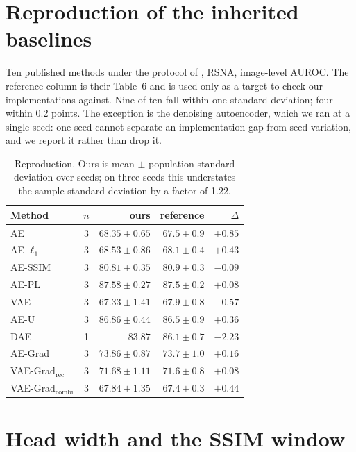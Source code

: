 \documentclass[pmlr,twocolumn,10pt]{jmlr} %
\begin{document}
\section{Reproduction of the inherited baselines}
\label{apd:repro}
Ten published methods under the protocol of \citet{cai2025medianomaly}, RSNA, image-level
AUROC. The reference column is their Table~6 and is used only as a target to check our
implementations against. Nine of ten fall within one standard deviation; four within 0.2
points. The exception is the denoising autoencoder, which we ran at a single seed: one
seed cannot separate an implementation gap from seed variation, and we report it rather
than drop it.

\begin{table}[h]
\centering\footnotesize
\caption{Reproduction. Ours is mean $\pm$ population standard deviation over seeds; on
three seeds this understates the sample standard deviation by a factor of 1.22.}
\begin{tabular}{@{}lcrrr@{}}
\toprule
Method & $n$ & ours & reference & $\Delta$ \\
\midrule
AE             & 3 & $68.35\pm0.65$ & $67.5\pm0.9$ & $+0.85$ \\
AE-$\ell_1$    & 3 & $68.53\pm0.86$ & $68.1\pm0.4$ & $+0.43$ \\
AE-SSIM        & 3 & $80.81\pm0.35$ & $80.9\pm0.3$ & $-0.09$ \\
AE-PL          & 3 & $87.58\pm0.27$ & $87.5\pm0.2$ & $+0.08$ \\
VAE            & 3 & $67.33\pm1.41$ & $67.9\pm0.8$ & $-0.57$ \\
AE-U           & 3 & $86.86\pm0.44$ & $86.5\pm0.9$ & $+0.36$ \\
DAE            & 1 & $83.87$        & $86.1\pm0.7$ & $-2.23$ \\
AE-Grad        & 3 & $73.86\pm0.87$ & $73.7\pm1.0$ & $+0.16$ \\
VAE-Grad$_{\mathrm{rec}}$   & 3 & $71.68\pm1.11$ & $71.6\pm0.8$ & $+0.08$ \\
VAE-Grad$_{\mathrm{combi}}$ & 3 & $67.84\pm1.35$ & $67.4\pm0.3$ & $+0.44$ \\
\bottomrule
\end{tabular}
\end{table}

\section{Head width and the SSIM window}
\label{apd:sweeps}
\end{document}
